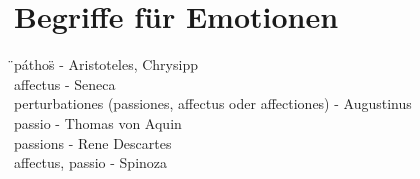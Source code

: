 \section{Begriffe für Emotionen}
\"{}páthos\"{} - Aristoteles, Chrysipp\\
affectus - Seneca\\
perturbationes (passiones, affectus oder affectiones) - Augustinus\\
passio - Thomas von Aquin\\
passions - Rene Descartes\\
affectus, passio - Spinoza\\








